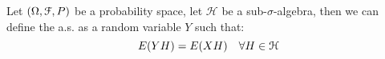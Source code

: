 Let \(\pqty{\Omega, \mathcal{F}, P}\) be a probability space, let \(\mathcal{H}\) be a sub-\(\sigma\)-algebra, then we can define the  a.s. as a random variable \(Y\) such that:
\begin{equation*}
    E(YH) = E\pqty{XH} \quad \forall H \in \mathcal{H}
\end{equation*}



    
